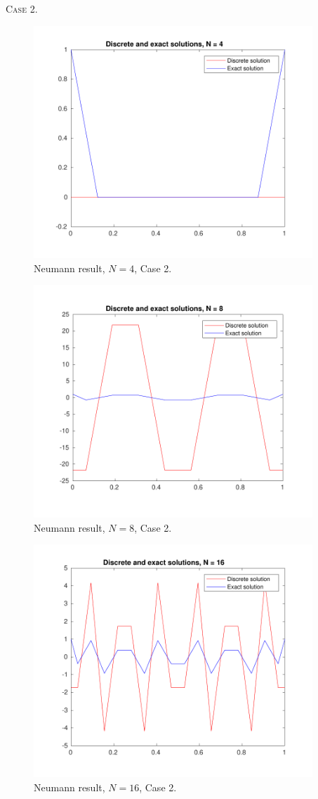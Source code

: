 \documentclass[a4paper]{article}
\numberwithin{equation}{section}
\begin{document}
\newpage
\noindent
\textsc{Case 2.}
\begin{figure}[H]
\centering\includegraphics[width=10.5cm]{fig_neumann_result_G1_CP1_I1_N4_M6_C2}
\caption{Neumann result, $N=4$, Case 2.}
\end{figure}
\begin{figure}[H]
\centering\includegraphics[width=10.5cm]{fig_neumann_result_G1_CP1_I1_N8_M6_C2}
\caption{Neumann result, $N=8$, Case 2.}
\end{figure}
\begin{figure}[H]
\centering\includegraphics[width=10.5cm]{fig_neumann_result_G1_CP1_I1_N16_M6_C2}
\caption{Neumann result, $N=16$, Case 2.}
\end{figure}
\end{document}
